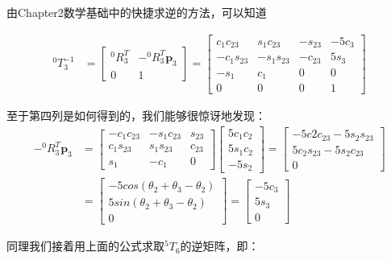 \documentclass{ctexart}
\begin{document}
由Chapter2数学基础中的快捷求逆的方法，可以知道

\begin{equation}
	\begin{aligned}
		^0T_3^{-1}&=\begin{bmatrix}
			^0R_3^T & -^0R_3^T\mathbf{p}_3 \\
			0 & 1
		\end{bmatrix}=
		\begin{bmatrix}
			c_1c_{23} & s_{1}c_{23} & -s_{23} & -5c_3 \\
			-c_1s_{23} & -s_1s_{23} & -c_{23} & 5s_3 \\
			-s_1 & c_1 & 0 & 0 \\
			0 & 0 & 0 & 1
			\end{bmatrix}
	\end{aligned}
\end{equation}

至于第四列是如何得到的，我们能够很惊讶地发现：
\begin{equation}
	\begin{aligned}
	-^0R_3^T\mathbf{p}_3&=\begin{bmatrix}
		-c_1c_{23} & -s_{1}c_{23} & s_{23} \\
		c_1s_{23} & s_1s_{23} & c_{23} \\
		s_1 & -c_1 & 0
	\end{bmatrix}\begin{bmatrix}
		5c_1c_2 \\
		5s_1c_2 \\
		-5s_2
	\end{bmatrix}=\begin{bmatrix}
		-5c2c_{23}-5s_2s_{23} \\
		5c_2s_{23}-5s_2c_{23} \\
		0
	\end{bmatrix}\\
	&=\begin{bmatrix}
		-5cos(\theta_2+\theta_3-\theta_2) \\
		5sin(\theta_2+\theta_3-\theta_2) \\
		0
	\end{bmatrix}=
	\begin{bmatrix}
		-5c_3 \\
		5s_3 \\
		0
	\end{bmatrix}
	\end{aligned}
\end{equation}

同理我们接着用上面的公式求取$^5T_6$的逆矩阵，即：
\end{document}
